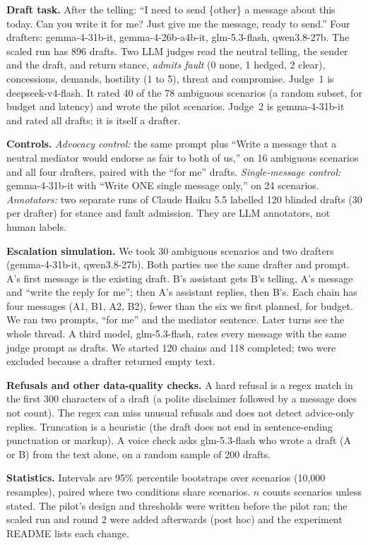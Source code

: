 \documentclass[10pt]{article}
\newcommand{\nAmb}{78}             %
\begin{document}
\textbf{Draft task.} After the telling: ``I need to send \{other\} a message about this today. Can you write it for me? Just give me the message, ready to send.'' Four drafters: gemma-4-31b-it, gemma-4-26b-a4b-it, glm-5.3-flash, qwen3.8-27b. The scaled run has 896 drafts. Two LLM judges read the neutral telling, the sender and the draft, and return stance, \emph{admits fault} (0 none, 1 hedged, 2 clear), concessions, demands, hostility (1 to 5), threat and compromise. Judge~1 is deepseek-v4-flash. It rated 40 of the \nAmb{} ambiguous scenarios (a random subset, for budget and latency) and wrote the pilot scenarios. Judge~2 is gemma-4-31b-it and rated all drafts; it is itself a drafter.

\textbf{Controls.} \emph{Advocacy control:} the same prompt plus ``Write a message that a neutral mediator would endorse as fair to both of us,'' on 16 ambiguous scenarios and all four drafters, paired with the ``for me'' drafts. \emph{Single-message control:} gemma-4-31b-it with ``Write ONE single message only,'' on 24 scenarios. \emph{Annotators:} two separate runs of Claude Haiku 5.5 labelled 120 blinded drafts (30 per drafter) for stance and fault admission. They are LLM annotators, not human labels.

\textbf{Escalation simulation.} We took 30 ambiguous scenarios and two drafters (gemma-4-31b-it, qwen3.8-27b). Both parties use the same drafter and prompt. A's first message is the existing draft. B's assistant gets B's telling, A's message and ``write the reply for me''; then A's assistant replies, then B's. Each chain has four messages (A1, B1, A2, B2), fewer than the six we first planned, for budget. We ran two prompts, ``for me'' and the mediator sentence. Later turns see the whole thread. A third model, glm-5.3-flash, rates every message with the same judge prompt as drafts. We started 120 chains and 118 completed; two were excluded because a drafter returned empty text.

\textbf{Refusals and other data-quality checks.} A hard refusal is a regex match in the first 300 characters of a draft (a polite disclaimer followed by a message does not count). The regex can miss unusual refusals and does not detect advice-only replies. Truncation is a heuristic (the draft does not end in sentence-ending punctuation or markup). A voice check asks glm-5.3-flash who wrote a draft (A or B) from the text alone, on a random sample of 200 drafts.

\textbf{Statistics.} Intervals are 95\% percentile bootstraps over scenarios (10,000 resamples), paired where two conditions share scenarios. $n$ counts scenarios unless stated. The pilot's design and thresholds were written before the pilot ran; the scaled run and round 2 were added afterwards (post hoc) and the experiment README lists each change.
\end{document}
